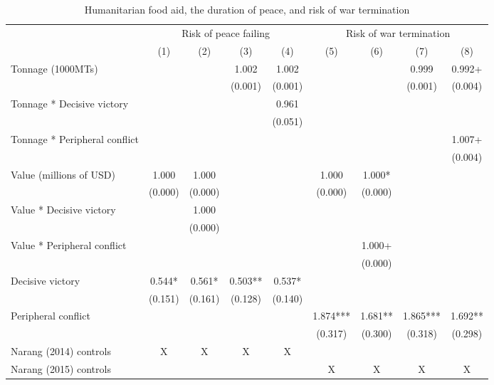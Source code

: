\begin{table}
\centering\centering
\caption{Humanitarian food aid, the duration of peace, and risk of war termination \label{survival_value_tonnage}}
\centering
\fontsize{8}{10}\selectfont
\begin{threeparttable}
\begin{tabular}[t]{lcccccccc}
\toprule
\multicolumn{1}{c}{ } & \multicolumn{4}{c}{Risk of peace failing} & \multicolumn{4}{c}{Risk of war termination} \\
\cmidrule(l{3pt}r{3pt}){2-5} \cmidrule(l{3pt}r{3pt}){6-9}
  & (1) & (2) & (3) & (4) & (5) & (6) & (7) & (8)\\
\midrule
Tonnage (1000MTs) &  &  & \num{1.002} & \num{1.002} &  &  & \num{0.999} & \num{0.992}+\\
 &  &  & (\num{0.001}) & (\num{0.001}) &  &  & (\num{0.001}) & (\num{0.004})\\
Tonnage * Decisive victory &  &  &  & \num{0.961} &  &  &  & \\
 &  &  &  & (\num{0.051}) &  &  &  & \\
Tonnage * Peripheral conflict &  &  &  &  &  &  &  & \num{1.007}+\\
 &  &  &  &  &  &  &  & (\num{0.004})\\
Value (millions of USD) & \num{1.000} & \num{1.000} &  &  & \num{1.000} & \num{1.000}* &  & \\
 & (\num{0.000}) & (\num{0.000}) &  &  & (\num{0.000}) & (\num{0.000}) &  & \\
Value * Decisive victory &  & \num{1.000} &  &  &  &  &  & \\
 &  & (\num{0.000}) &  &  &  &  &  & \\
Value * Peripheral conflict &  &  &  &  &  & \num{1.000}+ &  & \\
 &  &  &  &  &  & (\num{0.000}) &  & \\
Decisive victory & \num{0.544}* & \num{0.561}* & \num{0.503}** & \num{0.537}* &  &  &  & \\
 & (\num{0.151}) & (\num{0.161}) & (\num{0.128}) & (\num{0.140}) &  &  &  & \\
Peripheral conflict &  &  &  &  & \num{1.874}*** & \num{1.681}** & \num{1.865}*** & \num{1.692}**\\
 &  &  &  &  & (\num{0.317}) & (\num{0.300}) & (\num{0.318}) & (\num{0.298})\\
\midrule
Narang (2014) controls & X & X & X & X &  &  &  & \\
Narang (2015) controls &  &  &  &  & X & X & X & X\\

\end{tabular}
\end{threeparttable}
\end{table}
